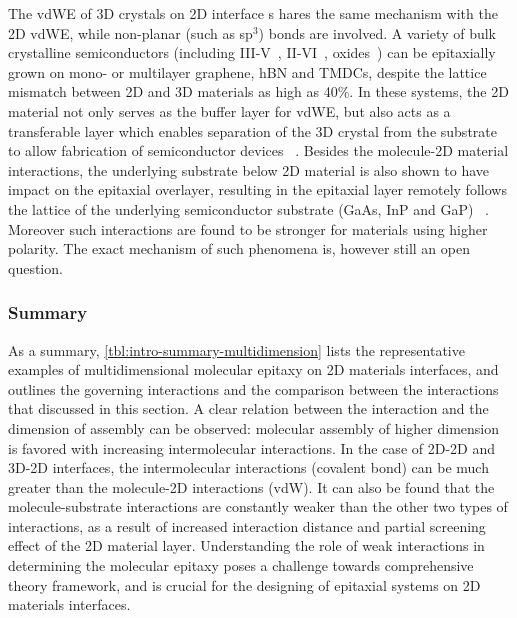 The vdWE of 3D crystals on 2D interface s
hares the same mechanism with the 2D
vdWE, while non-planar (such as sp\(^{\text{3}}\)) bonds are involved.
%
A variety of bulk crystalline semiconductors (including
III-V~\cite{Alaskar_2015_GaAs_gr_Si_theor,Kim_2017_remote_epi_Gr,Nepal_2013_GaN_gr,Kim_2014_direct_vdw_GaN_gr,Makimoto_2012_InGaN_hBN},
II-VI~\cite{Loeher_1994_vdw_epi_CdS_MoTe,Loeher_1996_CdTe_MoWTe},
oxides~\cite{Oh_2014_ZnO_hBN,Chung_2010_GaN_ZnO_gr})
can be epitaxially grown on mono- or multilayer graphene, hBN and TMDCs, despite the lattice mismatch between 2D and 3D materials as high as 40\%.
%
In
these systems, the 2D material not only serves as the buffer layer for
vdWE, but also acts as a transferable layer which enables separation
of the 3D crystal from the substrate to allow fabrication of
semiconductor devices
~\cite{Makimoto_2012_InGaN_hBN,Kobayashi_2012_GaN_hBN,Kim_2014_direct_vdw_GaN_gr,Kim_2017_remote_epi_Gr}.
%
Besides the molecule-2D material interactions, the underlying
substrate below 2D material is also shown to have impact on the
epitaxial overlayer, resulting in the epitaxial layer remotely follows
the  lattice of the underlying semiconductor substrate (GaAs, InP and GaP)
~\cite{Kim_2017_remote_epi_Gr}. Moreover such interactions are found to be stronger for materials using higher polarity. 
%
The exact mechanism of such phenomena is, however still an open question.


\subsubsection{Summary}
\label{sec:org0b4290f}

As a summary, \autoref{tbl:intro-summary-multidimension} lists the
representative examples of multidimensional molecular epitaxy on 2D
materials interfaces, and outlines the governing interactions and the
comparison between the interactions that discussed in this section. A
clear relation between the interaction and the dimension of assembly
can be observed: molecular assembly of higher dimension is favored
with increasing intermolecular interactions. In the case of 2D-2D and
3D-2D interfaces, the intermolecular interactions (covalent bond) can
be much greater than the molecule-2D interactions (vdW). It can also
be found that the molecule-substrate interactions are constantly
weaker than the other two types of interactions, as a result of
increased interaction distance and partial screening effect of the 2D
material layer. Understanding the role of weak interactions in
determining the molecular epitaxy poses a challenge towards
comprehensive theory framework, and is crucial for the designing of
epitaxial systems on 2D materials interfaces.


